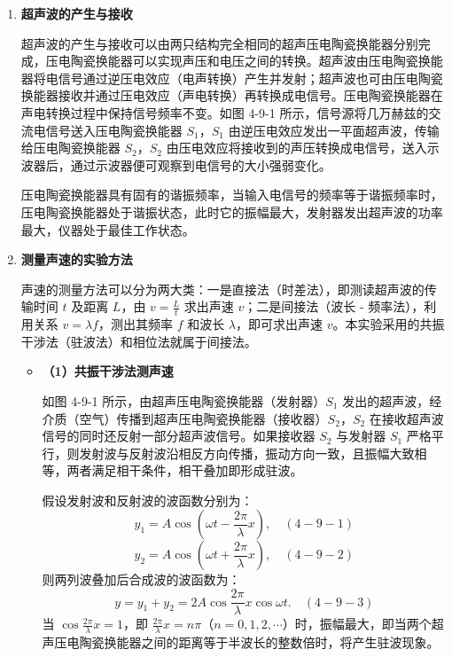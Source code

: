 \documentclass[12pt,a4paper]{article}
\begin{document}
\begin{enumerate}
\item \textbf{超声波的产生与接收}

超声波的产生与接收可以由两只结构完全相同的超声压电陶瓷换能器分别完成，压电陶瓷换能器可以实现声压和电压之间的转换。超声波由压电陶瓷换能器将电信号通过逆压电效应（电声转换）产生并发射；超声波也可由压电陶瓷换能器接收并通过压电效应（声电转换）再转换成电信号。压电陶瓷换能器在声电转换过程中保持信号频率不变。如图 4-9-1 所示，信号源将几万赫兹的交流电信号送入压电陶瓷换能器 $S_1$，$S_1$ 由逆压电效应发出一平面超声波，传输给压电陶瓷换能器 $S_2$，$S_2$ 由压电效应将接收到的声压转换成电信号，送入示波器后，通过示波器便可观察到电信号的大小强弱变化。

压电陶瓷换能器具有固有的谐振频率，当输入电信号的频率等于谐振频率时，压电陶瓷换能器处于谐振状态，此时它的振幅最大，发射器发出超声波的功率最大，仪器处于最佳工作状态。

\item \textbf{测量声速的实验方法}

声速的测量方法可以分为两大类：一是直接法（时差法），即测读超声波的传输时间 $t$ 及距离 $L$，由 $v=\frac{L}{t}$ 求出声速 $v$；二是间接法（波长 - 频率法），利用关系 $v=\lambda f$，测出其频率 $f$ 和波长 $\lambda$，即可求出声速 $v$。本实验采用的共振干涉法（驻波法）和相位法就属于间接法。

\begin{itemize}
\item \textbf{（1）共振干涉法测声速}

如图 4-9-1 所示，由超声压电陶瓷换能器（发射器）$S_1$ 发出的超声波，经介质（空气）传播到超声压电陶瓷换能器（接收器）$S_2$，$S_2$ 在接收超声波信号的同时还反射一部分超声波信号。如果接收器 $S_2$ 与发射器 $S_1$ 严格平行，则发射波与反射波沿相反方向传播，振动方向一致，且振幅大致相等，两者满足相干条件，相干叠加即形成驻波。

假设发射波和反射波的波函数分别为：
\begin{equation}
y_1=A\cos(\omega t-\frac{2\pi}{\lambda}x), \quad (4-9-1)
\end{equation}
\begin{equation}
y_2=A\cos(\omega t+\frac{2\pi}{\lambda}x), \quad (4-9-2)
\end{equation}
则两列波叠加后合成波的波函数为：
\begin{equation}
y=y_1+y_2=2A\cos\frac{2\pi}{\lambda}x\cos\omega t. \quad (4-9-3)
\end{equation}
当 $\cos\frac{2\pi}{\lambda}x=1$，即 $\frac{2\pi}{\lambda}x=n\pi$（$n=0,1,2,\cdots$）时，振幅最大，即当两个超声压电陶瓷换能器之间的距离等于半波长的整数倍时，将产生驻波现象。


\end{itemize}
\end{enumerate}
\end{document}
